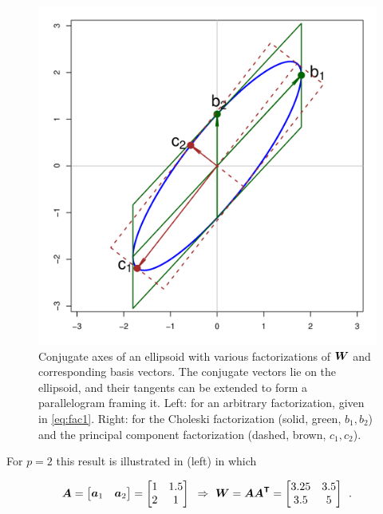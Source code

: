 \begin{figure}[htb]
\begin{minipage}[b]{.49\linewidth}
  \includegraphics[width=1\linewidth]{fig/conjugate2}
 \end{minipage}
\caption{Conjugate axes of an ellipsoid with various factorizations of $\bm{W}$ and corresponding
basis vectors.
The conjugate vectors lie on the ellipsoid, and their tangents can be extended to form a parallelogram framing it.
Left: for an arbitrary factorization, given in \eqref{eq:fac1}.
Right: for the Choleski factorization (solid, green, $b_1, b_2$) and the principal component factorization (dashed, brown, $c_1, c_2$).
}
\label{fig:conjugate}
\end{figure}
For
$p=2$
this result is illustrated in  (left)
in which

\begin{equation}\label{eq:fac1}
\bm{A}=\left[ \begin{matrix}
   \bm{a}_{1} & \bm{a}_{2}  \\
\end{matrix} \right]=\left[
\begin{matrix}
   1 & 1.5  \\
   2 & 1  \\
\end{matrix} \right]
\mbox{   }\Rightarrow\mbox{   }
\bm{W}=\bm{A A^\mathsf{T}}=
\left[ \begin{matrix}
   3.25 & 3.5  \\
   3.5 & 5  \\
\end{matrix} \right]
\:\: .
\end{equation}

